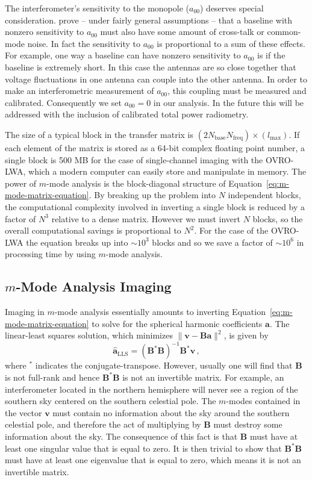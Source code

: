 \documentclass[twocolumn]{aastex61}
\renewcommand{\b}{\pmb}
\begin{document}
The interferometer's sensitivity to the monopole ($a_{00}$) deserves special consideration.
\citet{2016ApJ...826..116V} prove -- under fairly general assumptions -- that a baseline with
nonzero sensitivity to $a_{00}$ must also have some amount of cross-talk or common-mode noise.  In
fact the sensitivity to $a_{00}$ is proportional to a sum of these effects. For example, one way a
baseline can have nonzero sensitivity to $a_{00}$ is if the baseline is extremely short. In this
case the antennas are so close together that voltage fluctuations in one antenna can couple into the
other antenna. In order to make an interferometric measurement of $a_{00}$, this coupling must be
measured and calibrated. Consequently we set $a_{00}=0$ in our analysis. In the future this will be
addressed with the inclusion of calibrated total power radiometry.

The size of a typical block in the transfer matrix is
$(2N_\text{base}N_\text{freq})\times(l_\text{max})$. If each element of the matrix is stored as a
64-bit complex floating point number, a single block is 500 MB for the case of single-channel
imaging with the OVRO-LWA, which a modern computer can easily store and manipulate in memory.  The
power of $m$-mode analysis is the block-diagonal structure of
Equation~\ref{eq:m-mode-matrix-equation}.  By breaking up the problem into $N$ independent blocks,
the computational complexity involved in inverting a single block is reduced by a factor of $N^3$
relative to a dense matrix. However we must invert $N$ blocks, so the overall computational savings
is proportional to $N^2$.  For the case of the OVRO-LWA the equation breaks up into $\sim10^3$
blocks and so we save a factor of $\sim10^6$ in processing time by using $m$-mode analysis.

\subsection{$m$-Mode Analysis Imaging}\label{sec:mmode-imaging}

Imaging in $m$-mode analysis essentially amounts to inverting
Equation~\ref{eq:m-mode-matrix-equation} to solve for the spherical harmonic coefficients $\b a$.
The linear-least squares solution, which minimizes $\|\b v - \b B\b a\|^2$, is given by
\begin{equation}
    \b{\hat a}_\text{LLS} = (\b B^*\b B)^{-1}\b B^*\b v\,,
\end{equation}
where $^*$ indicates the conjugate-transpose. However, usually one will find that $\b B$ is not
full-rank and hence $\b B^*\b B$ is not an invertible matrix. For example, an interferometer located
in the northern hemisphere will never see a region of the southern sky centered on the southern
celestial pole. The $m$-modes contained in the vector $\b v$ must contain no information
about the sky around the southern celestial pole, and therefore the act of multiplying by $\b B$
must destroy some information about the sky. The consequence of this fact is that $\b B$ must have
at least one singular value that is equal to zero. It is then trivial to show that $\b B^*\b B$ must
have at least one eigenvalue that is equal to zero, which means it is not an invertible matrix.
\end{document}
